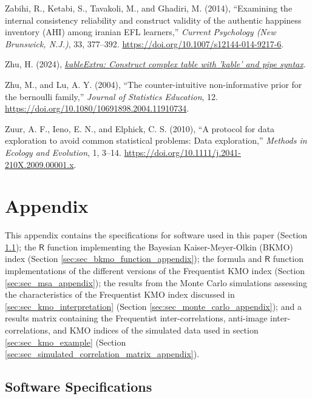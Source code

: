 \documentclass[
  10pt,
  a4paper,
  twoside]{article}
\newlength{\cslhangindent}
\newenvironment{CSLReferences}[2] %
 {\begin{list}{}{%
  \setlength{\itemindent}{0pt}
  \setlength{\leftmargin}{0pt}
  \setlength{\parsep}{0pt}
  \ifodd #1
   \setlength{\leftmargin}{\cslhangindent}
   \setlength{\itemindent}{-1\cslhangindent}
  \fi
  \setlength{\itemsep}{#2\baselineskip}}}
 {\end{list}}
\begin{document}
\begin{CSLReferences}{1}{0}
Zabihi, R., Ketabi, S., Tavakoli, M., and Ghadiri, M. (2014), {``Examining the internal consistency reliability and construct validity of the authentic happiness inventory (AHI) among iranian EFL learners,''} \emph{Current Psychology (New Brunswick, N.J.)}, 33, 377--392. \url{https://doi.org/10.1007/s12144-014-9217-6}.

Zhu, H. (2024), \emph{\href{https://CRAN.R-project.org/package=kableExtra}{kableExtra: Construct complex table with 'kable' and pipe syntax}}.

Zhu, M., and Lu, A. Y. (2004), {``The counter-intuitive non-informative prior for the bernoulli family,''} \emph{Journal of Statistics Education}, 12. \url{https://doi.org/10.1080/10691898.2004.11910734}.

Zuur, A. F., Ieno, E. N., and Elphick, C. S. (2010), {``A protocol for data exploration to avoid common statistical problems: Data exploration,''} \emph{Methods in Ecology and Evolution}, 1, 3--14. \url{https://doi.org/10.1111/j.2041-210X.2009.00001.x}.

\end{CSLReferences}

\newpage

\section{Appendix}\label{sec:sec_appendix}

This appendix contains the specifications for software used in this paper (Section \ref{sec:sec_software_appendix}); the \(\textsf{R}\) function implementing the Bayesian Kaiser-Meyer-Olkin (BKMO) index (Section \ref{sec:sec_bkmo_function_appendix}); the formula and \(\textsf{R}\) function implementations of the different versions of the Frequentist KMO index (Section \ref{sec:sec_msa_appendix}); the results from the Monte Carlo simulations assessing the characteristics of the Frequentist KMO index discussed in \ref{sec:sec_kmo_interpretation} (Section \ref{sec:sec_monte_carlo_appendix}); and a results matrix containing the Frequentist inter-correlations, anti-image inter-correlations, and KMO indices of the simulated data used in section \ref{sec:sec_kmo_example} (Section \ref{sec:sec_simulated_correlation_matrix_appendix}).

\subsection{Software Specifications}\label{sec:sec_software_appendix}
\end{document}
